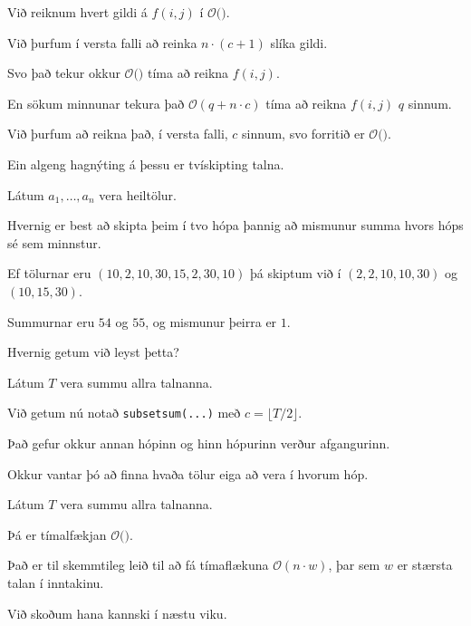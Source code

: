 {
}

{
	{
		\item<1-> Við reiknum hvert gildi á $f(i, j)$ í $\mathcal{O}($\onslide<2->{$\,1\,$}$)$.
		\item<3-> Við þurfum í versta falli að reinka $n \cdot (c + 1)$ slíka gildi.
		\item<4-> Svo það tekur okkur $\mathcal{O}($$)$ tíma að reikna $f(i, j)$.
		\item<6-> En sökum minnunar tekura það $\mathcal{O}(q + n \cdot c)$ tíma að reikna $f(i, j)$ $q$ sinnum.
		\item<7-> Við þurfum að reikna það, í versta falli, $c$ sinnum, svo forritið er $\mathcal{O}($\onslide<8->{$n \cdot c$}$)$.
	}
}

{
	{
		\item<1-> Ein algeng hagnýting á þessu er tvískipting talna.
		\item<2-> Látum $a_1, \dots, a_n$ vera heiltölur.
		\item<3-> Hvernig er best að skipta þeim í tvo hópa þannig að mismunur summa hvors hóps sé sem minnstur.
		\item<4-> Ef tölurnar eru $(10, 2, 10, 30, 15, 2, 30, 10)$ þá skiptum við í $(2, 2, 10, 10, 30)$ og $(10, 15, 30)$.
		\item<5-> Summurnar eru $54$ og $55$, og mismunur þeirra er $1$.
	}
}

{
	{
		\item<1-> Hvernig getum við leyst þetta?
		\item<2-> Látum $T$ vera summu allra talnanna.
		\item<3-> Við getum nú notað \texttt{subsetsum(...)} með $c = \lfloor T/2 \rfloor$.
		\item<4-> Það gefur okkur annan hópinn og hinn hópurinn verður afgangurinn.
		\item<5-> Okkur vantar þó að finna hvaða tölur eiga að vera í hvorum hóp.
	}
}

{
}

{
	{
		\item<1-> Látum $T$ vera summu allra talnanna.
		\item<2-> Þá er tímalfækjan $\mathcal{O}($\onslide<3->{$n \cdot T$}$)$.
		\item<4-> Það er til skemmtileg leið til að fá tímaflækuna $\mathcal{O}(n \cdot w)$, þar sem $w$ er stærsta talan í inntakinu.
		\item<5-> Við skoðum hana kannski í næstu viku.
	}
}

